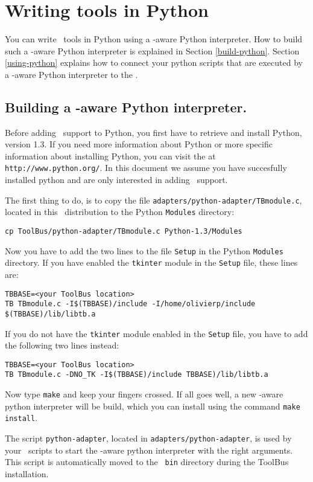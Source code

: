 
\section{\label{ToolsInPython}Writing tools in Python}

You can write \TB\ tools in Python using a \TB -aware Python interpreter.
How to build such a \TB -aware Python interpreter is explained in
Section \ref{build-python}. Section \ref{using-python} explains how
to connect your python scripts that are executed by a \TB -aware
Python interpreter to the \TB.

\subsection{\label{build-python}Building a \TB -aware Python interpreter.}

Before adding \TB\ support to Python, you first have to retrieve and
install Python, version 1.3. 
If you need more information about Python or more
specific information about installing Python, you can visit the
 at {\tt http://www.python.org/}. In this document
we assume you have succesfully installed python and are only interested
in adding \TB\ support.

The first thing to do, is to copy the file 
{\tt adapters/python-adapter/TBmodule.c}, located in this \TB\ distribution
to the Python {\tt Modules} directory:
\begin{verbatim}
cp ToolBus/python-adapter/TBmodule.c Python-1.3/Modules
\end{verbatim}
Now you have to add the two lines to the file {\tt Setup} 
in the Python {\tt Modules} directory.
If you have enabled the {\tt tkinter} module in the {\tt Setup} file,
these lines are:
\begin{verbatim}
TBBASE=<your ToolBus location>
TB TBmodule.c -I$(TBBASE)/include -I/home/olivierp/include $(TBBASE)/lib/libtb.a
\end{verbatim}
If you do not have the {\tt tkinter} module enabled in the {\tt Setup} file,
you have to add the following two lines instead:
\begin{verbatim}
TBBASE=<your ToolBus location>
TB TBmodule.c -DNO_TK -I$(TBBASE)/include TBBASE)/lib/libtb.a
\end{verbatim}
Now type {\tt make} and keep your fingers crossed. If all goes well,
a new \TB -aware python interpreter will be build, which you can install
using the command {\tt make install}.

The script {\tt python-adapter}, located in
{\tt adapters/python-adapter}, is used by your \TB\ scripts to start
the \TB -aware python interpreter with the right arguments. This
script is automatically moved to the \TB\ {\tt bin} directory during
the ToolBus installation.

